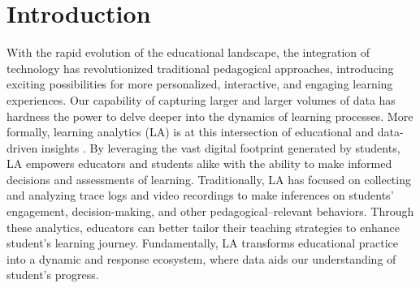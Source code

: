 \documentclass[manuscript,screen,review]{acmart}
\begin{document}


\maketitle

\section{Introduction} \label{sec:intro}

With the rapid evolution of the educational landscape, the integration of technology has revolutionized traditional pedagogical approaches, introducing exciting possibilities for more personalized, interactive, and engaging learning experiences. Our capability of capturing larger and larger volumes of data has hardness the power to delve deeper into the dynamics of learning processes. More formally, learning analytics (LA) is at this intersection of educational and data-driven insights \cite{}. By leveraging the vast digital footprint generated by students, LA empowers educators and students alike with the ability to make informed decisions and assessments of learning. Traditionally, LA has focused on collecting and analyzing trace logs and video recordings to make inferences on students' engagement, decision-making, and other pedagogical--relevant behaviors. Through these analytics, educators can better tailor their teaching strategies to enhance student's learning journey. Fundamentally, LA transforms educational practice into a dynamic and response ecosystem, where data aids our understanding of student's progress.
\end{document}
